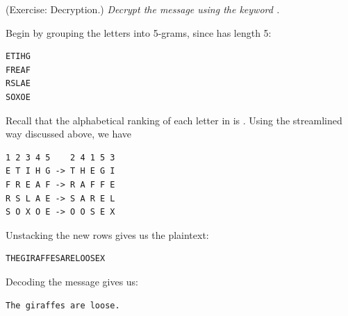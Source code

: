 \documentclass[letterpaper]{article}
\newcommand{\0}{\mathbf{0}}
\begin{document}
\begin{mdframed}[nobreak=true]
    (Exercise: Decryption.) \emph{Decrypt the message  using the keyword .}

    \begin{mdframed}
        Begin by grouping the letters into 5-grams, since  has length 5:
        \begin{mdframed}
            \begin{verbatim}
ETIHG
FREAF
RSLAE
SOXOE\end{verbatim}
        \end{mdframed}
        Recall that the alphabetical ranking of each letter in  is . Using the streamlined way discussed above, we have 
        \begin{mdframed}
            \begin{verbatim}
1 2 3 4 5    2 4 1 5 3
E T I H G -> T H E G I 
F R E A F -> R A F F E 
R S L A E -> S A R E L 
S O X O E -> O O S E X \end{verbatim}
        \end{mdframed}
        Unstacking the new rows gives us the plaintext:
        \begin{mdframed}
            \begin{verbatim}
THEGIRAFFESARELOOSEX\end{verbatim}
        \end{mdframed}
        Decoding the message gives us: 
        \begin{mdframed}
            \begin{verbatim}
The giraffes are loose.\end{verbatim}
        \end{mdframed}
    \end{mdframed}

\end{mdframed}
\end{document}
